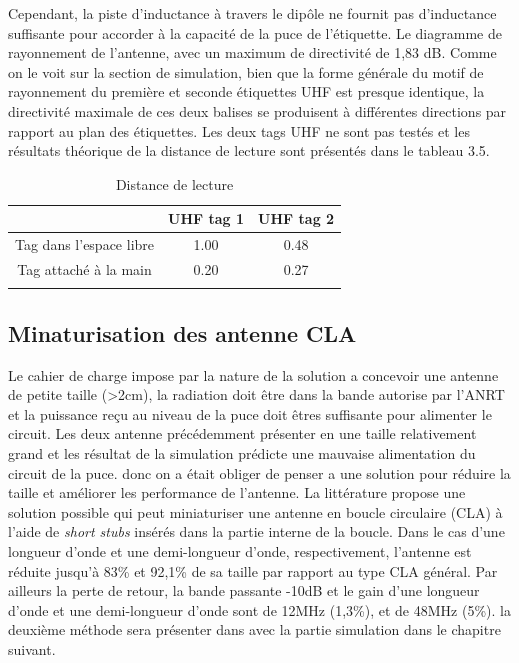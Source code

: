 \documentclass[11pt, a4paper, twoside]{book}
\begin{document}
Cependant, la piste d'inductance à travers le dipôle ne fournit pas d'inductance suffisante pour accorder à la capacité de la puce de l'étiquette. Le diagramme de rayonnement de l'antenne, avec un maximum de directivité de 1,83 dB. Comme on le voit sur la section de simulation, bien que la forme générale du motif de rayonnement du première et seconde étiquettes UHF est presque identique, la directivité maximale de ces deux balises se produisent à différentes directions par rapport au plan des étiquettes. Les deux tags UHF ne sont pas testés et les résultats théorique de la distance de lecture sont présentés dans le tableau 3.5.\\

\begin{longtable}[c]{| c | c | c |}
 \hline
  & UHF tag 1 & UHF tag 2 \\
 \hline
 Tag dans l'espace libre & 1.00 & 0.48\\
 \hline
 Tag attaché à la main  & 0.20 & 0.27\\
 \hline
\caption{Distance de lecture}
\end{longtable}
\subsection{Minaturisation des antenne CLA}
Le cahier de charge impose par la nature de la solution  a concevoir une antenne de petite taille (>2cm), la radiation doit être dans la bande autorise par l'ANRT et la puissance reçu au niveau de la puce doit êtres suffisante pour alimenter le circuit. Les deux antenne précédemment présenter en une taille relativement grand et les résultat de la simulation prédicte une mauvaise alimentation du circuit de la puce. donc on a était obliger de penser a une solution pour réduire la taille et améliorer les performance de l'antenne. La littérature \cite{stub}  propose une solution possible qui peut
miniaturiser une antenne en boucle circulaire (CLA) à l'aide de \emph{short stubs} insérés dans la partie interne de la boucle. Dans le cas d'une longueur d'onde et une demi-longueur d'onde, respectivement, l'antenne est réduite jusqu'à 83\% et 92,1\% de sa taille par rapport au type CLA général. Par ailleurs la perte de retour, la bande passante -10dB et le gain d'une longueur d'onde et une demi-longueur d'onde sont de 12MHz (1,3\%), et de 48MHz (5\%). la deuxième méthode sera présenter dans avec la partie simulation dans le chapitre suivant.\\
\end{document}
